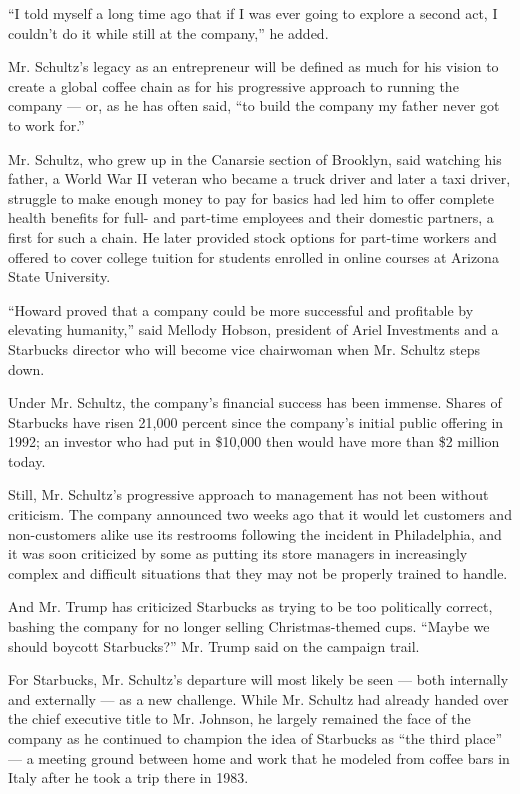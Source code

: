 ``I told myself a long time ago that if I was ever going to explore a
second act, I couldn't do it while still at the company,'' he added.

Mr. Schultz's legacy as an entrepreneur will be defined as much for his
vision to create a global coffee chain as for his progressive approach
to running the company --- or, as he has often said, ``to build the
company my father never got to work for.''

Mr. Schultz, who grew up in the Canarsie section of Brooklyn, said
watching his father, a World War II veteran who became a truck driver
and later a taxi driver, struggle to make enough money to pay for basics
had led him to offer complete health benefits for full- and part-time
employees and their domestic partners, a first for such a chain. He
later provided stock options for part-time workers and offered to cover
college tuition for students enrolled in online courses at Arizona State
University.

``Howard proved that a company could be more successful and profitable
by elevating humanity,'' said Mellody Hobson, president of Ariel
Investments and a Starbucks director who will become vice chairwoman
when Mr. Schultz steps down.

Under Mr. Schultz, the company's financial success has been immense.
Shares of Starbucks have risen 21,000 percent since the company's
initial public offering in 1992; an investor who had put in \$10,000
then would have more than \$2 million today.

Still, Mr. Schultz's progressive approach to management has not been
without criticism. The company announced two weeks ago that it would let
customers and non-customers alike use its restrooms following the
incident in Philadelphia, and it was soon criticized by some as putting
its store managers in increasingly complex and difficult situations that
they may not be properly trained to handle.

And Mr. Trump has criticized Starbucks as trying to be too politically
correct, bashing the company for no longer selling Christmas-themed
cups. ``Maybe we should boycott Starbucks?'' Mr. Trump said on the
campaign trail.

For Starbucks, Mr. Schultz's departure will most likely be seen --- both
internally and externally --- as a new challenge. While Mr. Schultz had
already handed over the chief executive title to Mr. Johnson, he largely
remained the face of the company as he continued to champion the idea of
Starbucks as ``the third place'' --- a meeting ground between home and
work that he modeled from coffee bars in Italy after he took a trip
there in 1983.


